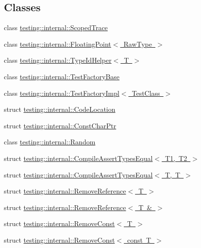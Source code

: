 \subsection*{Classes}
\begin{DoxyCompactItemize}
\item 
class \mbox{\hyperlink{classtesting_1_1internal_1_1_scoped_trace}{testing\+::internal\+::\+Scoped\+Trace}}
\item 
class \mbox{\hyperlink{classtesting_1_1internal_1_1_floating_point}{testing\+::internal\+::\+Floating\+Point$<$ Raw\+Type $>$}}
\item 
class \mbox{\hyperlink{classtesting_1_1internal_1_1_type_id_helper}{testing\+::internal\+::\+Type\+Id\+Helper$<$ T $>$}}
\item 
class \mbox{\hyperlink{classtesting_1_1internal_1_1_test_factory_base}{testing\+::internal\+::\+Test\+Factory\+Base}}
\item 
class \mbox{\hyperlink{classtesting_1_1internal_1_1_test_factory_impl}{testing\+::internal\+::\+Test\+Factory\+Impl$<$ Test\+Class $>$}}
\item 
struct \mbox{\hyperlink{structtesting_1_1internal_1_1_code_location}{testing\+::internal\+::\+Code\+Location}}
\item 
struct \mbox{\hyperlink{structtesting_1_1internal_1_1_const_char_ptr}{testing\+::internal\+::\+Const\+Char\+Ptr}}
\item 
class \mbox{\hyperlink{classtesting_1_1internal_1_1_random}{testing\+::internal\+::\+Random}}
\item 
struct \mbox{\hyperlink{structtesting_1_1internal_1_1_compile_assert_types_equal}{testing\+::internal\+::\+Compile\+Assert\+Types\+Equal$<$ T1, T2 $>$}}
\item 
struct \mbox{\hyperlink{structtesting_1_1internal_1_1_compile_assert_types_equal_3_01_t_00_01_t_01_4}{testing\+::internal\+::\+Compile\+Assert\+Types\+Equal$<$ T, T $>$}}
\item 
struct \mbox{\hyperlink{structtesting_1_1internal_1_1_remove_reference}{testing\+::internal\+::\+Remove\+Reference$<$ T $>$}}
\item 
struct \mbox{\hyperlink{structtesting_1_1internal_1_1_remove_reference_3_01_t_01_6_01_4}{testing\+::internal\+::\+Remove\+Reference$<$ T \& $>$}}
\item 
struct \mbox{\hyperlink{structtesting_1_1internal_1_1_remove_const}{testing\+::internal\+::\+Remove\+Const$<$ T $>$}}
\item 
struct \mbox{\hyperlink{structtesting_1_1internal_1_1_remove_const_3_01const_01_t_01_4}{testing\+::internal\+::\+Remove\+Const$<$ const T $>$}}

\end{DoxyCompactItemize}
